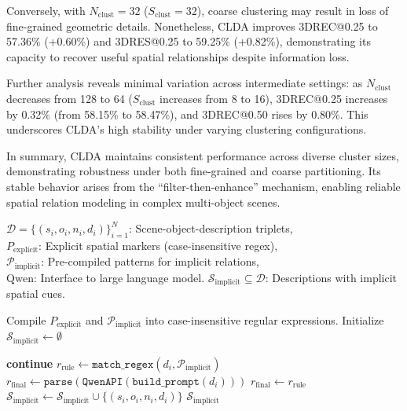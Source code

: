 \documentclass[letterpaper]{article} %
\begin{document}
Conversely, with $N_{\mathrm{clust}} = 32$ ($S_{\mathrm{clust}} = 32$), coarse clustering may result in loss of fine-grained geometric details. Nonetheless, CLDA improves 3DREC@0.25 to 57.36\% (+0.60\%) and 3DRES@0.25 to 59.25\% (+0.82\%), demonstrating its capacity to recover useful spatial relationships despite information loss.

Further analysis reveals minimal variation across intermediate settings: as $N_{\mathrm{clust}}$ decreases from 128 to 64 ($S_{\mathrm{clust}}$ increases from 8 to 16), 3DREC@0.25 increases by 0.32\% (from 58.15\% to 58.47\%), and 3DREC@0.50 rises by 0.80\%. This underscores CLDA’s high stability under varying clustering configurations.

In summary, CLDA maintains consistent performance across diverse cluster sizes, demonstrating robustness under both fine-grained and coarse partitioning. Its stable behavior arises from the ``filter-then-enhance'' mechanism, enabling reliable spatial relation modeling in complex multi-object scenes.


\begin{algorithm}[h]
	\caption{Construction of the Implicit Subset from ScanRefer.}
	\label{alg:implicit_subset}
	\begin{algorithmic}[1]
		\REQUIRE 
		$\mathcal{D} = \{(s_i, o_i, n_i, d_i)\}_{i=1}^N$: Scene-object-description triplets, \\
		$P_{\text{explicit}}$: Explicit spatial markers (case-insensitive regex), \\
		$\mathcal{P}_{\text{implicit}}$: Pre-compiled patterns for implicit relations, \\
		$\text{Qwen}$: Interface to large language model.
		\ENSURE 
		$\mathcal{S}_{\text{implicit}} \subseteq \mathcal{D}$: Descriptions with implicit spatial cues.
		
		\STATE Compile $P_{\text{explicit}}$ and $\mathcal{P}_{\text{implicit}}$ into case-insensitive regular expressions.
		\STATE Initialize $\mathcal{S}_{\text{implicit}} \leftarrow \emptyset$
		
		\STATE \textbf{continue}
		\ENDIF
		\STATE $r_{\text{rule}} \leftarrow \texttt{match\_regex}(d_i, \mathcal{P}_{\text{implicit}})$
		\STATE $r_{\text{final}} \leftarrow \texttt{parse}(\texttt{QwenAPI}(\texttt{build\_prompt}(d_i)))$
		\ELSE
		\STATE $r_{\text{final}} \leftarrow r_{\text{rule}}$
		\ENDIF
		\STATE $\mathcal{S}_{\text{implicit}} \leftarrow \mathcal{S}_{\text{implicit}} \cup \{ (s_i, o_i, n_i, d_i) \}$
		\ENDIF
		\ENDFOR
		\RETURN $\mathcal{S}_{\text{implicit}}$
	\end{algorithmic}
\end{algorithm}
\end{document}
